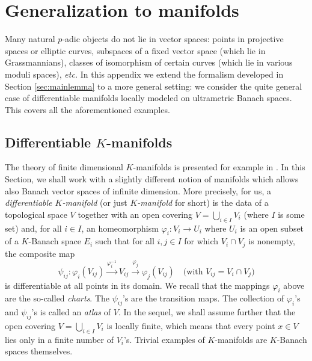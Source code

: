 \documentclass{lms}
\begin{document}
\appendix

\section{Generalization to manifolds}
\label{sec:manifold}

Many natural $p$-adic objects do not lie in vector spaces:
points in projective spaces or elliptic curves,
subspaces of a fixed vector space (which lie in Grassmannians),
classes of isomorphism of certain curves (which lie in various moduli spaces),
\emph{etc.}  In this appendix we extend the formalism 
developed in Section \ref{sec:mainlemma} to a more general setting:
we consider the quite general case of 
differentiable manifolds locally modeled on ultrametric Banach spaces.
This covers all the 
aforementioned examples.

\subsection{Differentiable $K$-manifolds}
\label{ssec:manifold}

The theory of finite dimensional $K$-manifolds is presented for example 
in \cite[\S 8, 9]{schneider:11a}. In this Section, we shall work with
a slightly different notion of manifolds which allows also Banach vector 
spaces of infinite dimension.
More precisely, for us, a \emph{ differentiable $K$-manifold} 
(or just \emph{$K$-manifold} for short) is the data of a topological 
space $V$ together with an open covering $V = \bigcup_{i \in I} V_i$ 
(where $I$ is some set) and, for all $i \in I$, an homeomorphism 
$\varphi_i : V_i \to U_i$ where $U_i$ is an open subset of a $K$-Banach space
$E_i$ such that for all $i,j \in I$ for which $V_i \cap V_j$ is 
nonempty, the composite map
\begin{equation}
\label{eq:psiij}
\psi_{ij} : 
\varphi_i(V_{ij}) \stackrel{\varphi_i^{-1}}{\longrightarrow} 
V_{ij} \stackrel{\varphi_j}{\longrightarrow} \varphi_j(V_{ij})
\quad \text{(with } V_{ij} = V_i \cap V_j \text{)}
\end{equation}
is differentiable at all points in its domain. We recall that
the mappings $\varphi_i$ above are the so-called \emph{charts}. The
$\psi_{ij}$'s are the transition maps. The collection of $\varphi_i$'s
and $\psi_{ij}$'s is called an \emph{atlas} of $V$. In the sequel, we 
shall assume further that the open covering $V = \bigcup_{i \in I} V_i$ 
is locally finite, which means that every point $x \in V$ lies only in a 
finite number of $V_i$'s. Trivial examples of $K$-manifolds are 
$K$-Banach spaces themselves.
\end{document}
